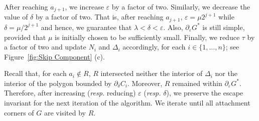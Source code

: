 \documentclass[11pt]{patmorin}
\begin{document}
After reaching $a_{j+1}$, we increase $\varepsilon$ by a factor of two. Similarly, we decrease the value of $\delta$ by a factor of two. That is, after reaching $a_{j+1}$, $\varepsilon = \mu 2^{j+1}$ while $\delta = \mu/2^{j+1}$ and hence, we guarantee that $\lambda < \delta < \varepsilon$.
Also, $\partial_\varepsilon G^*$ is still simple, provided that $\mu$ is initially chosen to be sufficiently small.
Finally, we reduce $\tau$ by a factor of two and update $N_i$ and $\Delta_i$ accordingly, for each $i\in \{1,\dots,n\}$; see Figure~\ref{fig:Skip Component} (c).

Recall that, for each $a_i\notin R$, $R$ intersected neither the interior of $\Delta_i$ nor the interior of the polygon bounded by $\partial_\delta C_i$. Moreover, $R$ remained within $\partial_\varepsilon G^*$.
Therefore, after increasing (\emph{resp.} reducing) $\varepsilon$ (\emph{resp.} $\delta$), we preserve the escape invariant for the next iteration of the algorithm.
We iterate until all attachment corners of $G$ are visited by $R$.
\end{document}
